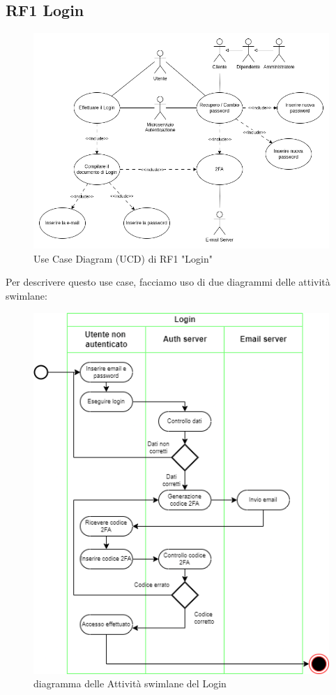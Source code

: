 \documentclass{report}
\begin{document}
\subsection*{RF1 Login }
\begin{figure}[H]
	\centering\includegraphics[width=1\textwidth]{images/UCD/RF1_login_UCD.png}
	Use Case Diagram (UCD) di RF1 "Login"
\end{figure}
Per descrivere questo use case, facciamo uso di due diagrammi delle attività swimlane:
\begin{figure}[H]
	\centering\includegraphics[width=1\textwidth]{images/Login_Swimlane.drawio.png}
	diagramma delle Attività swimlane del Login
\end{figure}
\end{document}
